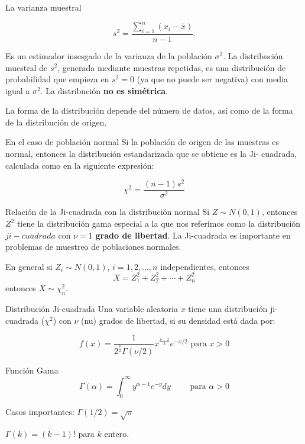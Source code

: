 \documentclass[
  10pt,
  ignorenonframetext,
]{beamer}
\begin{document}
\begin{frame}{}
\protect\hypertarget{section-46}{}
La varianza muestral

\[s^2=\frac{\sum_{i=1}^n (x_i -\bar{x})}{n-1}.\]

Es un estimador insesgado de la varianza de la población \(\sigma^2\).
La distribución muestral de \(s^2\), generada mediante muestras
repetidas, es una distribución de probabilidad que empieza en
\(s^2 = 0\) (ya que no puede ser negativa) con media igual a
\(\sigma^2\). La distribución \textbf{no es simétrica}.

La forma de la distribución depende del número de datos, así como de la
forma de la distribución de origen.
\end{frame}

\begin{frame}{}
\protect\hypertarget{section-47}{}
\begin{block}{En el caso de población normal}
\protect\hypertarget{en-el-caso-de-poblaciuxf3n-normal}{}
Si la población de origen de las muestras es normal, entonces la
distribución estandarizada que se obtiene es la Ji- cuadrada, calculada
como en la siguiente expresión:

\[\chi^2=\frac{(n-1)s^2}{\sigma^2}\]
\end{block}

\begin{block}{Relación de la Ji-cuadrada con la distribución normal}
\protect\hypertarget{relaciuxf3n-de-la-ji-cuadrada-con-la-distribuciuxf3n-normal}{}
Si \(Z \sim N(0,1)\), entonces \(Z^2\) tiene la distribución gama
especial a la que nos referimos como la distribución \(ji-cuadrada\) con
\(\nu = 1\) \textbf{grado de libertad}. La Ji-cuadrada es importante en
problemas de muestreo de poblaciones normales.

En general si \(Z_i \sim N(0,1)\), \(i=1,2,\ldots,n\) independientes,
entonces \[X=Z_1^2 +Z_2^2+\cdots+Z_n^2\] entonces \(X\sim\chi_n^2\).
\end{block}
\end{frame}

\begin{frame}{}
\protect\hypertarget{section-48}{}
\begin{block}{Distribución Ji-cuadrada}
\protect\hypertarget{distribuciuxf3n-ji-cuadrada}{}
Una variable aleatoria \(x\) tiene una distribución ji-cuadrada
(\(\chi^2\)) con \(\nu\) (nu) grados de libertad, si su densidad está
dada por:

\[f(x)=\frac{1}{2^{\frac{\nu}{2}}\Gamma(\nu/2)}x^{\frac{\nu-2}{2}}e^{-x/2} \mbox{ para } x>0\]
\end{block}

\begin{block}{Función Gama}
\protect\hypertarget{funciuxf3n-gama}{}
\[\Gamma(\alpha)=\int_0^\infty y^{\alpha -1}e^{-y}dy \qquad \mbox{ para } \alpha >0\]

Casos importantes: \(\Gamma(1/2)=\sqrt{\pi}\)

\(\Gamma(k)= (k-1)!\) para \(k\) entero.
\end{block}
\end{frame}
\end{document}
